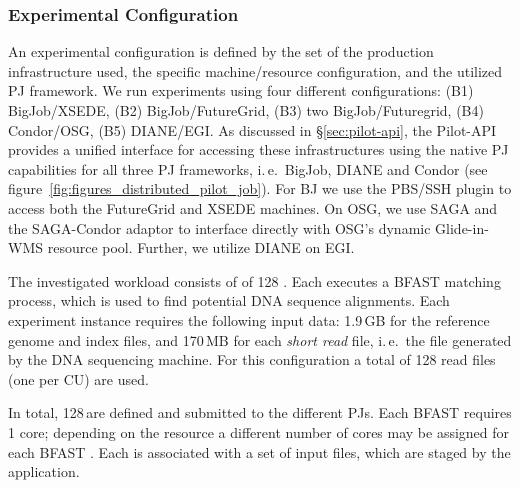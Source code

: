 \documentclass[conference]{IEEEtran}
\begin{document}

\subsubsection*{Experimental Configuration}


An experimental configuration is defined by the set of the production
infrastructure used, the specific machine/resource configuration, and
the utilized PJ framework.  We run experiments using four different
configurations: (B1) BigJob/XSEDE, (B2) BigJob/FutureGrid, (B3) two
BigJob/Futuregrid, (B4) Condor/OSG, (B5) DIANE/EGI.   As discussed in
\S\ref{sec:pilot-api}, the Pilot-API provides a unified interface for
accessing these infrastructures using the native PJ  capabilities for all three PJ
frameworks, i.\,e.\ BigJob, DIANE and Condor (see
figure~\ref{fig:figures_distributed_pilot_job}).  For BJ we use the
PBS/SSH plugin to access both the FutureGrid and XSEDE machines.  On
OSG, we use SAGA and the SAGA-Condor adaptor to interface directly
with OSG's dynamic Glide-in-WMS resource pool. Further, we utilize
DIANE on EGI.

The investigated workload consists of of 128 \cus. Each \cu executes a
BFAST matching process, which is used to find potential DNA sequence
alignments. Each experiment instance requires the following input
data: 1.9\,GB for the reference genome and index files, and 170\,MB
for each \textit{short read} file, i.\,e.\ the file generated by the
DNA sequencing machine. For this configuration a total of 128 read
files (one per CU) are used.


 In total,
128\,\cus are defined and submitted to the different PJs. Each BFAST \cu
requires 1 core; depending on the resource a different number of cores may be
assigned for each BFAST \cu. Each \cu is associated with a set of input files,
which are staged by the application.
\end{document}
